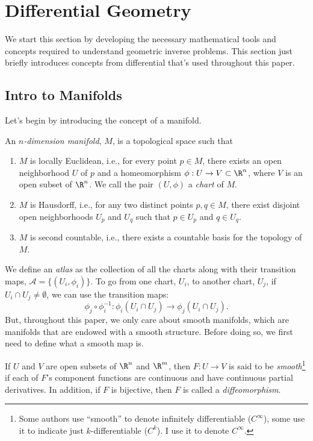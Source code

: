 \section{Differential Geometry}
\label{sec:differential_geometry}

We start this section by developing the necessary mathematical tools and concepts required to understand geometric inverse problems. This section just briefly introduces concepts from differential that's used throughout this paper.

\subsection{Intro to Manifolds} Let's begin by introducing the concept of a manifold.
\begin{definition}
  An \emph{$n$-dimension manifold}, $M$, is a topological space such that
  \begin{enumerate}
    \item $M$ is locally Euclidean, i.e., for every point $p \in M$, there exists an open neighborhood $U$ of $p$ and a homeomorphism $\phi : U \to V \subset \R^n$, where $V$ is an open subset of $\R^n$. We call the pair $(U, \phi)$ a \emph{chart} of $M$.
    \item $M$ is Hausdorff, i.e., for any two distinct points $p, q \in M$, there exist disjoint open neighborhoods $U_p$ and $U_q$ such that $p \in U_p$ and $q \in U_q$.
    \item $M$ is second countable, i.e., there exists a countable basis for the topology of $M$.
  \end{enumerate}
\end{definition}
We define an \textit{atlas} as the collection of all the charts along with their transition maps, $\mathcal{A} = \{(U_i, \phi_i)\}$. To go from one chart, $U_i$, to another chart, $U_j$, if $U_i \cap U_j \ne \emptyset$, we can use the transition maps:
\[%
  \phi_j \circ \phi_i^{-1} : \phi_i(U_i \cap U_j) \to \phi_j(U_i \cap U_j)
.\]%
But, throughout this paper, we only care about smooth manifolds, which are manifolds that are endowed with a smooth structure. Before doing so, we first need to define what a smooth map is.
\begin{definition}
  If $U$ and $V$ are open subsets of $\R^n$ and $\R^m$, then $F : U \to V$ is said to be \emph{smooth}\footnote{Some authors use ``smooth'' to denote infinitely differentiable ($C^\infty$), some use it to indicate just $k$-differentiable ($C^k$). I use it to denote $C^\infty$.} if each of $F$'s component functions are continuous and have continuous partial derivatives. In addition, if $F$ is bijective, then $F$ is called a \emph{diffeomorphism}.
\end{definition}
